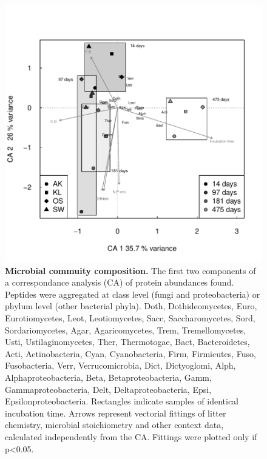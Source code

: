 \documentclass[10pt]{article}
\begin{document}
\begin{flushleft}
\newpage
\begin{figure}[h!]
\vspace*{2mm}
\begin{center}
\includegraphics{ligpaper-metaprot_pca}
\end{center}
\caption{
{\bf Microbial commuity composition.} The first two components of a correspondance analysis (CA) of protein abundances found. Peptides were aggregated at class level (fungi and proteobacteria) or phylum level (other bacterial phyla).  	Doth, Dothideomycetes, Euro, Eurotiomycetes, Leot, Leotiomycetes, Sacc, Saccharomycetes, Sord, Sordariomycetes, Agar,	Agaricomycetes, Trem, Tremellomycetes, Usti, Ustilaginomycetes, Ther, Thermotogae, Bact,  Bacteroidetes, Acti, Actinobacteria, Cyan, Cyanobacteria, Firm, Firmicutes, Fuso, Fusobacteria, Verr, Verrucomicrobia, Dict, Dictyoglomi, Alph, Alphaproteobacteria, Beta, Betaproteobacteria, Gamm, Gammaproteobacteria, Delt, Deltaproteobacteria, Epsi, Epsilonproteobacteria. Rectangles indicate samples of identical incubation time. Arrows represent vectorial fittings of litter chemistry, microbial stoichiometry and other context data, calculated independently from the CA. Fittings were plotted only if p\textless0.05.}
\label{fig:metaprotpca}
\end{figure}


\end{flushleft}
\end{document}
